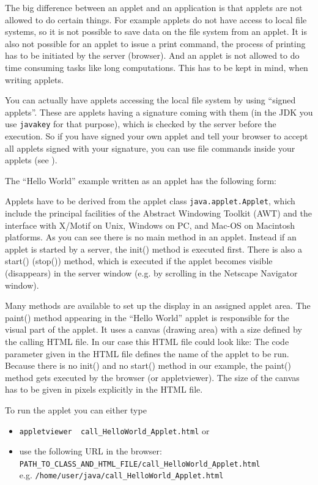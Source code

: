 The big difference between an applet and an application is that
applets are not allowed to do certain things. For example applets
do not have access to local file systems, so it is not possible
to save data on the file system from an applet. It is also not
possible for an applet to issue a print command, the process of
printing has to be initiated by the server (browser). 
And an applet is not allowed to do time consuming tasks like
long computations. This has to be kept in mind, when writing
applets.

You can actually have applets accessing the local file system by using
``signed applets''. These are applets having a signature coming
with them (in the JDK you use \verb|javakey| for that purpose), 
which is checked by the server before the execution. So
if you have signed your own applet and tell your browser to accept 
all applets signed with your signature, you can use file commands
inside your applets (see \cite[page 142]{javanutshell}).

The ``Hello World'' example written as an applet has the following form:

Applets have to be derived from the applet class
\verb|java.applet.Applet|, which include the principal facilities of
the Abstract Windowing Toolkit (AWT) and the interface with X/Motif on
Unix, Windows on PC, and Mac-OS on Macintosh platforms.
As you can see there is no main method in an applet. Instead if an applet
is started by a server, the init() method is executed first. There is also
a start() (stop()) method, which is executed if the applet becomes
visible (disappears) in the server window (e.g. by scrolling in the
Netscape Navigator window).

Many methods are available to set up the display in an assigned applet area.
The paint() method appearing in the ``Hello World'' applet is
responsible for the visual part of the applet. It uses a canvas
(drawing area) with a size defined by the calling HTML file. In our case
this HTML file could look like:
The code parameter given in the HTML file defines the name of the applet
to be run. Because there is no init() and no start() method in our
example, the paint() method gets executed by the browser (or appletviewer).
The size of the canvas has to be given in pixels explicitly in the
HTML file.

To run the applet you can either type
\begin{itemize}
\item \verb|appletviewer  call_HelloWorld_Applet.html| or
\item use the following URL in the browser: \\
        \verb|PATH_TO_CLASS_AND_HTML_FILE/call_HelloWorld_Applet.html| \\
        e.g. \verb|/home/user/java/call_HelloWorld_Applet.html|
\end{itemize}


